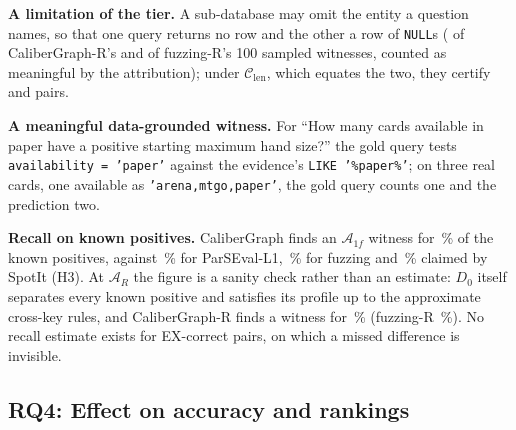 \textbf{A limitation of the tier.} A sub-database may omit the entity a question names, so that one query returns no row and the other a row of \texttt{NULL}s ( of CaliberGraph-R's and  of fuzzing-R's 100 sampled witnesses, counted as meaningful by the attribution); under $\mathcal C_{\mathrm{len}}$, which equates the two, they certify  and  pairs.

\textbf{A meaningful data-grounded witness.} For ``How many cards available in paper have a positive starting maximum hand size?'' the gold query tests \texttt{availability = 'paper'} against the evidence's \texttt{LIKE '\%paper\%'}; on three real cards, one available as \texttt{'arena,mtgo,paper'}, the gold query counts one and the prediction two.

\textbf{Recall on known positives.} CaliberGraph finds an $\mathcal A_{1f}$ witness for \,\% of the  known positives, against \,\% for ParSEval-L1, \,\% for fuzzing and \,\% claimed by SpotIt (H3). At $\mathcal A_R$ the figure is a sanity check rather than an estimate: $D_0$ itself separates every known positive and satisfies its profile up to the approximate cross-key rules, and CaliberGraph-R finds a witness for \,\% (fuzzing-R \,\%). No recall estimate exists for EX-correct pairs, on which a missed difference is invisible.


\subsection{RQ4: Effect on accuracy and rankings}\label{sec:rankings}

\begin{table}[t]
\centering\footnotesize
\caption{Per-system effect on the 1,174 test questions. Count-based: share of EX-correct predictions with a CaliberGraph $\mathcal A_{1f}$ witness, and EX after removing all of them (EX$'$). Error-weighted: certified share $\times$ attributed prediction-error rate (\,\% at $\mathcal A_{1f}$, \,\% at $\mathcal A_R$), in points of EX; a lower bound (post hoc).}\label{tab:systems}
\setlength{\tabcolsep}{3pt}
\end{table}

